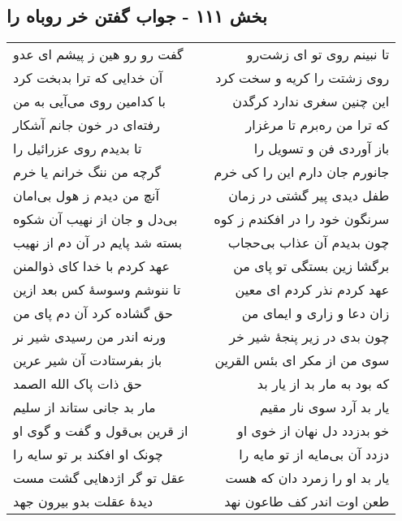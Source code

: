 \begin{center}
\section*{بخش ۱۱۱ - جواب گفتن خر روباه را}
\label{sec:sh111}
\begin{longtable}{l p{0.5cm} r}
گفت رو رو هین ز پیشم ای عدو
&&
تا نبینم روی تو ای زشت‌رو
\\
آن خدایی که ترا بدبخت کرد
&&
روی زشتت را کریه و سخت کرد
\\
با کدامین روی می‌آیی به من
&&
این چنین سغری ندارد کرگدن
\\
رفته‌ای در خون جانم آشکار
&&
که ترا من ره‌برم تا مرغزار
\\
تا بدیدم روی عزرائیل را
&&
باز آوردی فن و تسویل را
\\
گرچه من ننگ خرانم یا خرم
&&
جانورم جان دارم این را کی خرم
\\
آنچ من دیدم ز هول بی‌امان
&&
طفل دیدی پیر گشتی در زمان
\\
بی‌دل و جان از نهیب آن شکوه
&&
سرنگون خود را در افکندم ز کوه
\\
بسته شد پایم در آن دم از نهیب
&&
چون بدیدم آن عذاب بی‌حجاب
\\
عهد کردم با خدا کای ذوالمنن
&&
برگشا زین بستگی تو پای من
\\
تا ننوشم وسوسهٔ کس بعد ازین
&&
عهد کردم نذر کردم ای معین
\\
حق گشاده کرد آن دم پای من
&&
زان دعا و زاری و ایمای من
\\
ورنه اندر من رسیدی شیر نر
&&
چون بدی در زیر پنجهٔ شیر خر
\\
باز بفرستادت آن شیر عرین
&&
سوی من از مکر ای بئس القرین
\\
حق ذات پاک الله الصمد
&&
که بود به مار بد از یار بد
\\
مار بد جانی ستاند از سلیم
&&
یار بد آرد سوی نار مقیم
\\
از قرین بی‌قول و گفت و گوی او
&&
خو بدزدد دل نهان از خوی او
\\
چونک او افکند بر تو سایه را
&&
دزدد آن بی‌مایه از تو مایه را
\\
عقل تو گر اژدهایی گشت مست
&&
یار بد او را زمرد دان که هست
\\
دیدهٔ عقلت بدو بیرون جهد
&&
طعن اوت اندر کف طاعون نهد
\\
\end{longtable}
\end{center}
